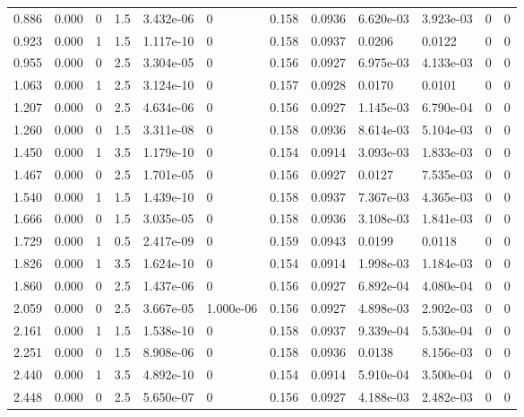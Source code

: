 \documentclass[preview]{standalone}
\begin{document}
{{\begin{tabular}{L{1.2cm}C{1.2cm} C{0.3cm}C{0.5cm} C{1.4cm}C{1.4cm} C{1.4cm}C{1.4cm} C{1.6cm}C{1.6cm} C{1.6cm}C{1.6cm}}
  0.886  &  0.000  & 0     & 1.5 &  3.432e-06  & 0  &  0.158&   0.0936& 6.620e-03 & 3.923e-03   &  0 & 0  \\ 
  0.923  &  0.000  & 1     & 1.5 &  1.117e-10  & 0  &  0.158&   0.0937& 0.0206 & 0.0122   &  0 & 0  \\ 
  0.955  &  0.000  & 0     & 2.5 &  3.304e-05  & 0  &  0.156&   0.0927& 6.975e-03 & 4.133e-03   &  0 & 0  \\ 
  1.063  &  0.000  & 1     & 2.5 &  3.124e-10  & 0  &  0.157&   0.0928& 0.0170 & 0.0101   &  0 & 0  \\ 
  1.207  &  0.000  & 0     & 2.5 &  4.634e-06  & 0  &  0.156&   0.0927& 1.145e-03 & 6.790e-04   &  0 & 0  \\ 
  1.260  &  0.000  & 0     & 1.5 &  3.311e-08  & 0  &  0.158&   0.0936& 8.614e-03 & 5.104e-03   &  0 & 0  \\ 
  1.450  &  0.000  & 1     & 3.5 &  1.179e-10  & 0  &  0.154&   0.0914& 3.093e-03 & 1.833e-03   &  0 & 0  \\ 
  1.467  &  0.000  & 0     & 2.5 &  1.701e-05  & 0  &  0.156&   0.0927& 0.0127 & 7.535e-03   &  0 & 0  \\ 
  1.540  &  0.000  & 1     & 1.5 &  1.439e-10  & 0  &  0.158&   0.0937& 7.367e-03 & 4.365e-03   &  0 & 0  \\ 
  1.666  &  0.000  & 0     & 1.5 &  3.035e-05  & 0  &  0.158&   0.0936& 3.108e-03 & 1.841e-03   &  0 & 0  \\ 
  1.729  &  0.000  & 1     & 0.5 &  2.417e-09  & 0  &  0.159&   0.0943& 0.0199 & 0.0118   &  0 & 0  \\ 
  1.826  &  0.000  & 1     & 3.5 &  1.624e-10  & 0  &  0.154&   0.0914& 1.998e-03 & 1.184e-03   &  0 & 0  \\ 
  1.860  &  0.000  & 0     & 2.5 &  1.437e-06  & 0  &  0.156&   0.0927& 6.892e-04 & 4.080e-04   &  0 & 0  \\ 
  2.059  &  0.000  & 0     & 2.5 &  3.667e-05  & 1.000e-06  &  0.156&   0.0927& 4.898e-03 & 2.902e-03   &  0 & 0  \\ 
  2.161  &  0.000  & 1     & 1.5 &  1.538e-10  & 0  &  0.158&   0.0937& 9.339e-04 & 5.530e-04   &  0 & 0  \\ 
  2.251  &  0.000  & 0     & 1.5 &  8.908e-06  & 0  &  0.158&   0.0936& 0.0138 & 8.156e-03   &  0 & 0  \\ 
  2.440  &  0.000  & 1     & 3.5 &  4.892e-10  & 0  &  0.154&   0.0914& 5.910e-04 & 3.500e-04   &  0 & 0  \\ 
  2.448  &  0.000  & 0     & 2.5 &  5.650e-07  & 0  &  0.156&   0.0927& 4.188e-03 & 2.482e-03   &  0 & 0  \\ 

\end{tabular}}}
\end{document}
